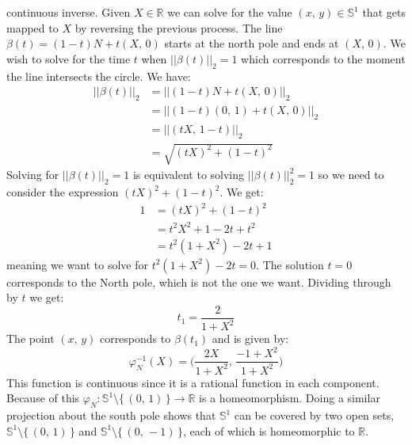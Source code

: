 \documentclass{article}
\theoremstyle{plain}
\theoremstyle{normal}
\begin{document}
        continuous inverse. Given $X\in\mathbb{R}$ we can solve for the value
        $(x,\,y)\in\mathbb{S}^{1}$ that gets mapped to $X$ by reversing the
        previous process. The line
        $\beta(t)=(1-t)N+t(X,\,0)$ starts at the north pole and ends at
        $(X,\,0)$. We wish to solve for the time $t$ when
        $||\beta(t)||_{2}=1$ which corresponds to the moment the line
        intersects the circle. We have:
        \begin{align}
            ||\beta(t)||_{2}
            &=||(1-t)N+t(X,\,0)||_{2}\\
            &=||(1-t)(0,\,1)+t(X,\,0)||_{2}\\
            &=||(tX,\,1-t)||_{2}\\
            &=\sqrt{(tX)^{2}+(1-t)^{2}}
        \end{align}
        Solving for $||\beta(t)||_{2}=1$ is equivalent to solving
        $||\beta(t)||_{2}^{2}=1$ so we need to consider the expression
        $(tX)^{2}+(1-t)^{2}$. We get:
        \begin{align}
            1&=(tX)^{2}+(1-t)^{2}\\
            &=t^{2}X^{2}+1-2t+t^{2}\\
            &=t^{2}(1+X^{2})-2t+1
        \end{align}
        meaning we want to solve for $t^{2}(1+X^{2})-2t=0$. The solution
        $t=0$ corresponds to the North pole, which is not the one we want.
        Dividing through by $t$ we get:
        \begin{equation}
            t_{1}=\frac{2}{1+X^{2}}
        \end{equation}
        The point $(x,\,y)$ corresponds to $\beta(t_{1})$ and is given by:
        \begin{equation}
            \varphi_{N}^{-1}(X)=
            \Big(\frac{2X}{1+X^{2}},\,\frac{-1+X^{2}}{1+X^{2}}\Big)
        \end{equation}
        This function is continuous since it is a rational function in each
        component. Because of this
        $\varphi_{N}:\mathbb{S}^{1}\setminus\{\,(0,\,1)\,\}\rightarrow\mathbb{R}$
        is a homeomorphism. Doing a similar projection about the south pole
        shows that $\mathbb{S}^{1}$ can be covered by two open sets,
        $\mathbb{S}^{1}\setminus\{\,(0,\,1)\,\}$ and
        $\mathbb{S}^{1}\setminus\{\,(0,\,-1)\,\}$, each of which is
        homeomorphic to $\mathbb{R}$.
        \par\hfill\par
\end{document}
